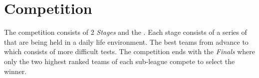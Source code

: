 \section{Competition}
The competition consists of 2 \emph{Stages} and the . Each stage consists of a series of  that are being held in a daily life environment. The best teams from  advance to  which consists of more difficult tests. The competition ends with the \emph{Finals} where only the two highest ranked teams of each sub-league compete to select the winner.